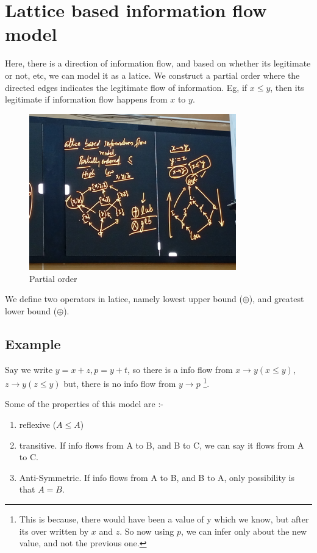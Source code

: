\documentclass[english, 11pt]{article}
\begin{document}
\section*{Lattice based information flow model}
Here, there is a direction of information flow, and based on whether its legitimate or not, etc, we can model it as a latice. We construct a partial order where the directed edges indicates the legitimate flow of information. Eg, if $x \le y$, then its legitimate if information flow happens from $x$ to $y$.
\begin{figure}[h!]
  \centering
  \includegraphics[width=0.8\textwidth]{images/partial_order.jpg}
  \caption*{Partial order}
\end{figure}
We define two operators in latice, namely lowest upper bound ($\oplus$), and greatest lower bound ($\oplus$).

\subsection*{Example}
Say we write $y = x+z, p = y + t$, so there is a info flow from $x \rightarrow y(x \le y)$, $z \rightarrow y(z \le y)$ but, there is no info flow from $y \rightarrow p$ \footnote{This is because, there would have been a value of y which we know, but after its over written by $x$ and $z$. So now using $p$, we can infer only about the new value, and not the previous one.}.

Some of the properties of this model are :-
\begin{enumerate}
  \item reflexive ($A \le A$)
  \item transitive. If info flows from A to B, and B to C, we can say it flows from A to C.
  \item Anti-Symmetric. If info flows from A to B, and B to A, only possibility is that $A = B$.
\end{enumerate}
\end{document}
